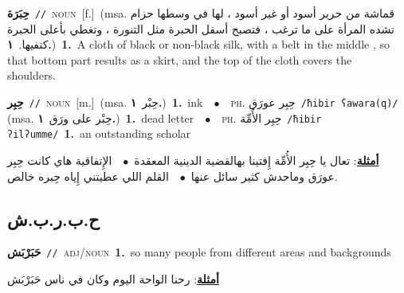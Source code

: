 \documentclass[10pt,a4paper,twoside]{article} %
\begin{document}
\begin{multicols}{2}
{\setlength\topsep{0pt}\textbf{\foreignlanguage{arabic}{حِبَرَة}}\ {\color{gray}\texttt{//}\color{black}}\ \textsc{noun}\ [f.]\ \color{gray}(msa. \foreignlanguage{arabic}{قماشة من حرير أسود أو غير أسود ، لها في وسطها حزام تشده المرأة على ما ترغب ، فتصبح أسفل الحبرة مثل التنورة ، وتغطي بأعلى الحبرة كتفيها.}~\foreignlanguage{arabic}{\textbf{١.}})\color{black}\ \textbf{1.}~A cloth of black or non-black silk, with a belt in the middle , so that bottom part results as a skirt, and the top of the cloth covers the shoulders.\ } \vspace{2mm}

{\setlength\topsep{0pt}\textbf{\foreignlanguage{arabic}{حِبِر}}\ {\color{gray}\texttt{//}\color{black}}\ \textsc{noun}\ [m.]\ \color{gray}(msa. \foreignlanguage{arabic}{حِبْر}~\foreignlanguage{arabic}{\textbf{١.}})\color{black}\ \textbf{1.}~ink\ \ $\bullet$\ \ \textsc{ph.} \color{gray} \foreignlanguage{arabic}{حِبِر عورَق}\color{black}\ {\color{gray}\texttt{/{\sffamily ħibir ʕawara(q)}/}\color{black}}\ \color{gray} (msa. \foreignlanguage{arabic}{حِبْر على ورَق}~\foreignlanguage{arabic}{\textbf{١.}})\color{black}\ \textbf{1.}~dead letter\ \ $\bullet$\ \ \textsc{ph.} \color{gray} \foreignlanguage{arabic}{حِبِر الأُمِّة}\color{black}\ {\color{gray}\texttt{/{\sffamily ħibir ʔilʔumme}/}\color{black}}\ \textbf{1.}~an outstanding scholar\  \begin{flushright}\color{gray}\foreignlanguage{arabic}{\textbf{\underline{\foreignlanguage{arabic}{أمثلة}}}: تعال يا حِبِر الأُمِّة إِفتينا بهالقضية الدينية المعقدة\ $\bullet$\ \  الإِتفاقية هاي كانت حِبِر عورَق وماحدش كثير سائل عنها\ $\bullet$\ \  القلم اللي عطيتني إِياه حِبره خالص.}\end{flushright}\color{black}} \vspace{2mm}

\vspace{-3mm}
\subsection*{\color{blue}\foreignlanguage{arabic}{ح.ب.ر.ب.ش}\color{blue}{ (ntws)}} 

{\setlength\topsep{0pt}\textbf{\foreignlanguage{arabic}{حَبَرْبَش}}\ {\color{gray}\texttt{//}\color{black}}\ \textsc{adj/noun}\ \textbf{1.}~so many people from different areas and backgrounds\  \begin{flushright}\color{gray}\foreignlanguage{arabic}{\textbf{\underline{\foreignlanguage{arabic}{أمثلة}}}: رحنا الواحة اليوم وكان في ناس حَبَرْبَش}\end{flushright}\color{black}} \vspace{2mm}


\end{multicols}
\end{document}
